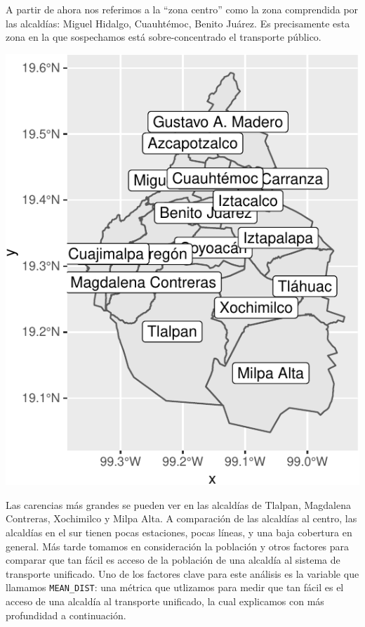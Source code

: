 \documentclass[
  spanish,
]{article}
\begin{document}
A partir de ahora nos referimos a la ``zona centro'' como la zona
comprendida por las alcaldías: Miguel Hidalgo, Cuauhtémoc, Benito
Juárez. Es precisamente esta zona en la que sospechamos está
sobre-concentrado el transporte público.

\begin{center}\includegraphics{proyecto_files/figure-latex/mapa-alc-1} \end{center}

Las carencias más grandes se pueden ver en las alcaldías de Tlalpan,
Magdalena Contreras, Xochimilco y Milpa Alta. A comparación de las
alcaldías al centro, las alcaldías en el sur tienen pocas estaciones,
pocas líneas, y una baja cobertura en general. Más tarde tomamos en
consideración la población y otros factores para comparar que tan fácil
es acceso de la población de una alcaldía al sistema de transporte
unificado. Uno de los factores clave para este análisis es la variable
que llamamos \texttt{MEAN\_DIST}: una métrica que utlizamos para medir
que tan fácil es el acceso de una alcaldía al transporte unificado, la
cual explicamos con más profundidad a continuación.
\end{document}
